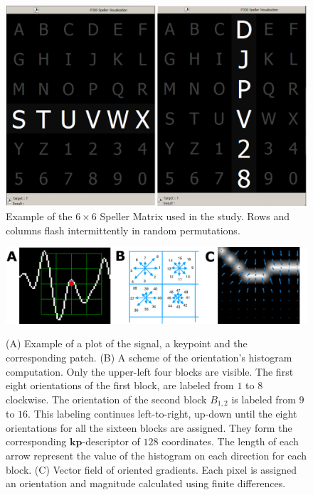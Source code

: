 \documentclass[utf8]{frontiersSCNS} %
\begin{document}
\begin{figure}[h!]
\centering
\includegraphics[width=15cm]{openvibep300matrix.png}
\caption{Example of the $6 \times 6$ Speller Matrix used in the study.  Rows and columns flash intermittently in random permutations.}
\label{fig:p300matrix}
\end{figure}

\begin{figure}[h!]
\centering
\includegraphics[width=16cm]{gradients.png}\label{samplegradients}
\caption{ (A) Example of a plot of the signal, a keypoint and the corresponding patch. (B) A scheme of the orientation's histogram computation.  Only the upper-left four blocks are visible.  The first eight orientations of the first block, are labeled from $1$ to $8$ clockwise. The orientation of the second block $ B_{1,2} $ is labeled from $9$ to $16$.  This labeling continues left-to-right, up-down until the eight orientations for all the sixteen blocks are assigned. They form the corresponding $\mathbf{kp}$-descriptor of $128$ coordinates.  The length of each arrow represent the value of the histogram on each direction for each block. (C) Vector field of oriented gradients.  Each pixel is assigned an orientation and magnitude calculated  using finite differences. }
\label{fig:sampledescriptor}
\end{figure}
\end{document}
